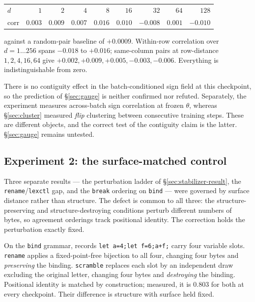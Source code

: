 \begin{center}
\begin{tabular}{lrrrrrrrr}
\hline
$d$ & $1$ & $2$ & $4$ & $8$ & $16$ & $32$ & $64$ & $128$ \\
corr & $0.003$ & $0.009$ & $0.007$ & $0.016$ & $0.010$ & $-0.008$ & $0.001$ & $-0.010$ \\
\hline
\end{tabular}
\end{center}

against a random-pair baseline of $+0.0009$. Within-row correlation over
$d=1\ldots256$ spans $-0.018$ to $+0.016$; same-column pairs at row-distance
$1,2,4,16,64$ give $+0.002,+0.009,+0.005,-0.003,-0.006$. Everything is
indistinguishable from zero.

\begin{observation}
\label{obs:contig-null}
There is no contiguity effect in the batch-conditioned sign field at this
checkpoint, so the prediction of \S\ref{sec:gauge} is neither confirmed nor
refuted. Separately, the experiment measures across-batch sign correlation at
frozen $\theta$, whereas \S\ref{sec:cluster} measured \emph{flip} clustering
between consecutive training steps. These are different objects, and the
correct test of the contiguity claim is the latter. \S\ref{sec:gauge} remains
untested.
\end{observation}

\subsection{Experiment 2: the surface-matched control}
\label{sec:matched}

Three separate results --- the perturbation ladder of \S\ref{sec:stabilizer-result},
the \texttt{rename}/\texttt{lexctl} gap, and the \texttt{break} ordering on
\texttt{bind} --- were governed by surface distance rather than structure. The
defect is common to all three: the structure-preserving and
structure-destroying conditions perturb different numbers of bytes, so
agreement orderings track positional identity. The correction holds the
perturbation exactly fixed.

On the \texttt{bind} grammar, records \texttt{let a=4;let f=6;a+f;} carry four
variable slots. \texttt{rename} applies a fixed-point-free bijection to all
four, changing four bytes and \emph{preserving} the binding.
\texttt{scramble} replaces each slot by an independent draw excluding the
original letter, changing four bytes and \emph{destroying} the binding.
Positional identity is matched by construction; measured, it is $0.803$ for
both at every checkpoint. Their difference is structure with surface held
fixed.

